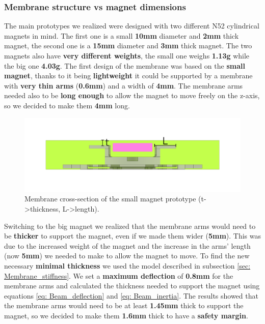 \subsubsection{Membrane structure vs magnet dimensions}
The main prototypes we realized were designed with two different N52 cylindrical magnets in mind.
The first one is a small \textbf{10mm} diameter and \textbf{2mm} thick magnet, the second one is a \textbf{15mm} diameter and \textbf{3mm} thick magnet.
The two magnets also have \textbf{very different weights}, the small one weighs \textbf{1.13g} while the big one \textbf{4.03g}.
The first design of the membrane was based on the \textbf{small magnet}, thanks to it being \textbf{lightweight} it could be supported by a membrane with \textbf{very thin arms} (\textbf{0.6mm}) and a width of \textbf{4mm}.
The membrane arms needed also to be \textbf{long enough} to allow the magnet to move freely on the z-axis, so we decided to make them \textbf{4mm} long.
\begin{figure}[H]
    \centering
    \includegraphics[width = 0.9\linewidth]{Chapters/Chapter5/Flexible_Mat_Prototypes/Figures/membrane_v1_section.png}
    \caption[Small prototype membrane cross-section]{Membrane cross-section of the small magnet prototype (t->thickness, L->length).}
    \label{fig: Membrane_v1_section}
\end{figure}

Switching to the big magnet we realized that the membrane arms would need to be \textbf{thicker} to support the magnet, even if we made them wider (\textbf{5mm}).
This was due to the increased weight of the magnet and the increase in the arms' length (now \textbf{5mm}) we needed to make to allow the magnet to move.
To find the new necessary \textbf{minimal thickness} we used the model described in subsection \ref{sec: Membrane_stiffness}.
We set a \textbf{maximum deflection} of \textbf{0.8mm} for the membrane arms and calculated the thickness needed to support the magnet using equations \ref{eq: Beam_deflection} and \ref{eq: Beam_inertia}.
The results showed that the membrane arms would need to be at least \textbf{1.45mm} thick to support the magnet, so we decided to make them \textbf{1.6mm} thick to have a \textbf{safety margin}.

